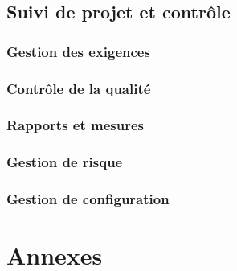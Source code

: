 \documentclass[a4paper,10pt,twoside]{article}
\begin{document}
\subsection{Suivi de projet et contrôle}
\subsubsection{Gestion des exigences}
\subsubsection{Contrôle de la qualité}
\subsubsection{Rapports et mesures}
\subsubsection{Gestion de risque}
\subsubsection{Gestion de configuration}



\section{Annexes}
\end{document}

